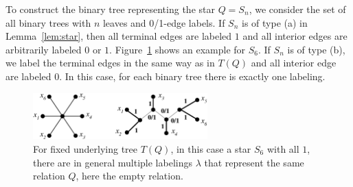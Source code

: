 \documentclass[smallextended]{svjour3}
\begin{document}
To construct the binary tree representing the star $Q=S_n$, we consider the
set of all binary trees with $n$ leaves and 0/1-edge labels. If $S_n$ is of
type (a) in Lemma~\ref{lem:star}, then all terminal edges are labeled $1$
and all interior edges are arbitrarily labeled $0$ or $1$.
Figure~\ref{fig:non_lrt} shows an example for $S_6$.  If $S_n$ is of type
(b), we label the terminal edges in the same way as in $T(Q)$ and all
interior edge are labeled 0. In this case, for each binary tree there is
exactly one labeling.

\begin{figure}[htbp]
\begin{center}
\includegraphics[width=0.6\textwidth]{non_lrt-new.eps}
\end{center}
\caption{For fixed underlying tree $T(Q)$, in this case a star $S_6$ with
  all $1$, there are in general multiple labelings $\lambda$ that represent
  the same relation $Q$, here the empty relation.}
\label{fig:non_lrt}
\end{figure}

 
\end{document}
